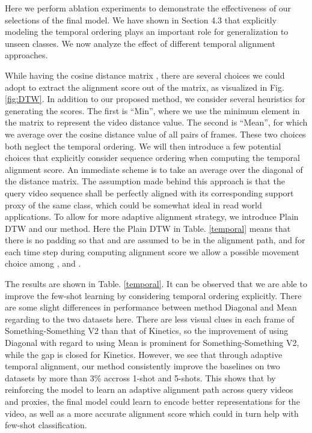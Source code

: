 \documentclass[10pt,twocolumn,letterpaper]{article}
\begin{document}
Here we perform ablation experiments to demonstrate the effectiveness of our selections of the final model. We have shown in Section 4.3 that explicitly modeling the temporal ordering plays an important role for generalization to unseen classes. We now analyze the effect of different temporal alignment approaches.

While having the cosine distance matrix , there are several choices we could adopt to extract the alignment score out of the matrix, as visualized in Fig. \ref{fig:DTW}. In addition to our proposed method, we consider several heuristics for generating the scores. The first is ``Min'', where we use the minimum element in the matrix  to represent the video distance value. The second is ``Mean'', for which we average over the cosine distance value of all pairs of frames. These two choices both neglect the temporal ordering. We will then introduce a few potential choices that explicitly consider sequence ordering when computing the temporal alignment score. An immediate scheme is to take an average over the diagonal of the distance matrix. The assumption made behind this approach is that the query video sequence shall be perfectly aligned with its corresponding support proxy of the same class, which could be somewhat ideal in read world applications. To allow for more adaptive alignment strategy, we introduce Plain DTW and our method. Here the Plain DTW in Table. \ref{temporal} means that there is no padding so that  and  are assumed to be in the alignment path, and for each time step during computing alignment score we allow a possible movement choice among ,  and . 

The results are shown in Table. \ref{temporal}. It can be observed that we are able to improve the few-shot learning by considering temporal ordering explicitly. There are some slight differences in performance between method Diagonal and Mean regarding to the two datasets here. There are less visual clues in each frame of Something-Something V2 than that of Kinetics, so the improvement of using Diagonal with regard to using Mean is prominent for Something-Something V2, while the gap is closed for Kinetics. However, we see that through adaptive temporal alignment, our method consistently improve the baselines on two datasets by more than 3\% accross 1-shot and 5-shots. This shows that by reinforcing the model to learn an adaptive alignment path across query videos and proxies, the final model could learn to encode better representations for the video, as well as a more accurate alignment score which could in turn help with few-shot classification.
\end{document}
